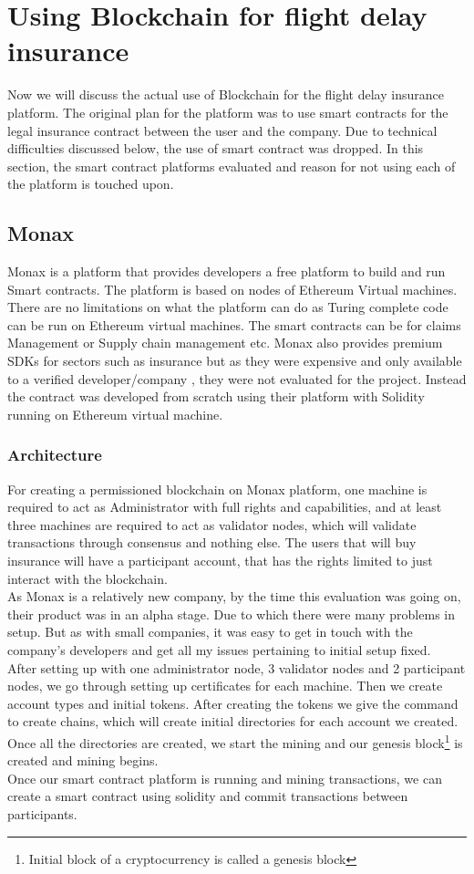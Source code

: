 \section{Using Blockchain for flight delay insurance}
Now we will discuss the actual use of Blockchain for the flight delay insurance platform. The original plan for the platform was to use smart contracts for the legal insurance contract between the user and the company. Due to technical difficulties discussed below, the use of smart contract was dropped. In this section, the smart contract platforms evaluated and reason for not using each of the platform is touched upon.

\subsection{Monax}
Monax is a platform that provides developers a free platform to build and run Smart contracts. The platform is based on nodes of Ethereum Virtual machines. There are no limitations on what the platform can do as Turing complete code can be run on Ethereum virtual machines. The smart contracts can be for claims Management or Supply chain management etc. Monax also provides premium SDKs for sectors such as insurance but as they were expensive and only available to a verified developer/company , they were not evaluated for the project. Instead the contract was developed from scratch using their platform with Solidity running on Ethereum virtual machine. 
\subsubsection{Architecture}
For creating a permissioned blockchain on Monax platform, one machine is  required to act as Administrator with full rights and capabilities, and at least three machines are required to act as validator nodes, which will validate transactions through consensus and nothing else. The users that will buy insurance will have a participant account, that has the rights limited to just interact with the blockchain.
\\As Monax is a relatively new company, by the time this evaluation was going on, their product was in an alpha stage. Due to which there were many problems in setup. But as with small companies, it was easy to get in touch with the company's developers and get all my issues pertaining to initial setup fixed. 
\\After setting up with one administrator node, 3 validator nodes and 2 participant nodes, we go through setting up certificates for each machine. Then we create account types and initial tokens. After creating the tokens we give the command to create chains, which will create initial directories for each account we created. Once all the directories are created, we start the mining and our genesis block\footnote{Initial block of a cryptocurrency is called a genesis block} is created and mining begins.
\\Once our smart contract platform is running and mining transactions, we can create a smart contract using solidity and commit transactions between participants.

